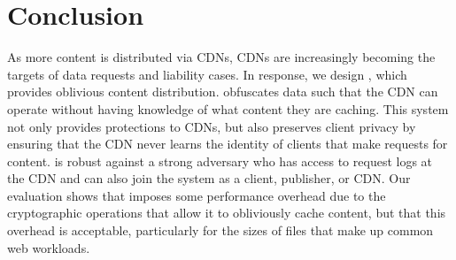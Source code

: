 \section{Conclusion}
\label{sec:conclusion}

As more content is distributed via CDNs, CDNs are increasingly becoming the
targets of data requests and liability cases. In response, we design \system{}, which provides oblivious content
distribution.  \system{} obfuscates data such that the CDN can operate without
having knowledge of what content they are caching.  This system not only
provides protections to CDNs, but also preserves client privacy by ensuring
that the CDN never learns the identity of clients that
make requests for content. \system{} is robust against a strong adversary who
has access to request logs at the CDN and can also join the system as a
client, publisher, or CDN. Our evaluation shows that \system{} imposes some performance
overhead due to the cryptographic operations that allow it to obliviously cache
content, but that this overhead is acceptable, particularly for the sizes of files
that make up common web workloads.
